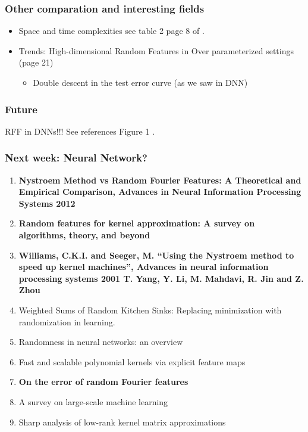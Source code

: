 \begin{frame}
  \frametitle{Other comparation and interesting fields}
\begin{itemize}
  \item Space and time complexities see table 2 page 8 of \cite{liu2021random}.
  \item Trends: High-dimensional Random Features in Over parameterized settings (page 21)
  \begin{itemize}
    \item Double descent in the
    test error curve (as we saw in DNN)
  \end{itemize}
\end{itemize}
  

\end{frame}

\begin{frame}
  \frametitle{Future}

  RFF in DNNs!!!
  See references Figure 1 \cite{liu2021random}.

\end{frame}

\begin{frame}
  \frametitle{Next week: Neural Network? }

  \begin{enumerate}
    \item \textbf{Nystroem Method vs Random Fourier Features: A Theoretical and Empirical Comparison, Advances in Neural Information Processing Systems 2012}
    
    \item \textbf{Random features for kernel approximation: A survey on algorithms, theory, and beyond}
    \item \textbf{Williams, C.K.I. and Seeger, M. “Using the Nystroem method to speed up kernel machines”, Advances in neural information processing systems 2001
    T. Yang, Y. Li, M. Mahdavi, R. Jin and Z. Zhou }
    \item Weighted Sums of Random Kitchen Sinks: Replacing minimization with randomization in learning.
    \item Randomness in neural networks: an overview
    \item Fast and scalable polynomial kernels via explicit feature maps
    \item \textbf{On the error of random Fourier features}
    \item A survey on large-scale machine learning
    \item Sharp analysis of low-rank kernel matrix approximations
\end{enumerate}

\end{frame}


